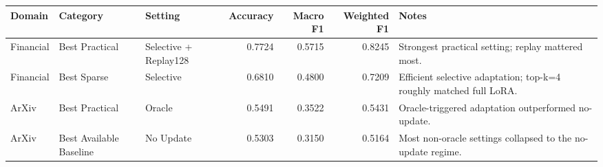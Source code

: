 \begin{tabular}{lllrrrl}
\toprule
Domain & Category & Setting & Accuracy & Macro F1 & Weighted F1 & Notes \\
\midrule
Financial & Best Practical & Selective + Replay128 & 0.7724 & 0.5715 & 0.8245 & Strongest practical setting; replay mattered most. \\
Financial & Best Sparse & Selective & 0.6810 & 0.4800 & 0.7209 & Efficient selective adaptation; top-k=4 roughly matched full LoRA. \\
ArXiv & Best Practical & Oracle & 0.5491 & 0.3522 & 0.5431 & Oracle-triggered adaptation outperformed no-update. \\
ArXiv & Best Available Baseline & No Update & 0.5303 & 0.3150 & 0.5164 & Most non-oracle settings collapsed to the no-update regime. \\
\bottomrule
\end{tabular}
